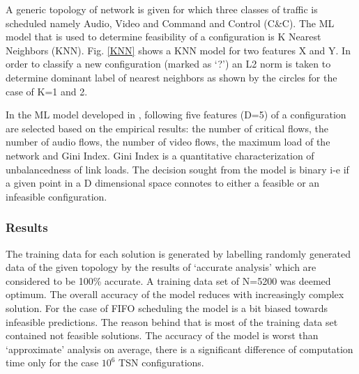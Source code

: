 \documentclass[journal,12pt,twocolumn]{IEEEtran}
\begin{document}
A generic topology of network is given for which three classes of traffic is scheduled namely Audio, Video and Command and Control (C\&C). The ML model that is used to determine feasibility of a configuration is K Nearest Neighbors (KNN). Fig. \ref{KNN} shows a KNN model for two features X and Y. In order to classify a new configuration (marked as `?') an L2 norm is taken to determine dominant label of nearest neighbors as shown by the circles for the case of K=1 and 2.

In the ML model developed in \cite{ML}, following five features (D=5) of a configuration are selected based on the empirical results: the number of critical flows, the number of audio flows, the number of video flows, the maximum load of the network and Gini Index. Gini Index \cite{GINI} is a quantitative characterization of unbalancedness of link loads. The decision sought from the model is binary i-e if a given point in a D dimensional space connotes to either a feasible or an infeasible configuration.
\subsubsection{Results}
The training data for each solution is generated by labelling randomly generated data of the given topology by the results of `accurate analysis' \cite{8,9,37} which are considered to be 100\% accurate. A training data set of N=5200 was deemed optimum.
The overall accuracy of the model reduces with increasingly complex solution. For the case of FIFO scheduling the model is a bit biased towards infeasible predictions. The reason behind that is most of the training data set contained not feasible solutions.
The accuracy of the model is worst than `approximate' analysis on average, there is a significant difference of computation time only for the case $10^6$ TSN configurations.
\end{document}
